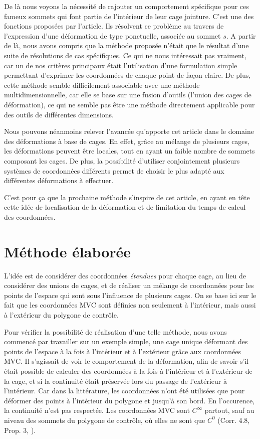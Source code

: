 De là nous voyons la nécessité de rajouter un comportement spécifique
pour ces fameux sommets qui font partie de l'intérieur de leur cage
jointure. C'est une des fonctions proposées par l'article. Ils
résolvent ce problème au travers de l'expression d'une déformation de
type ponctuelle, associée au sommet $s$. A partir de là, nous avons
compris que la méthode proposée \cite{GPCP13} n'était que le résultat
d'une suite de résolutions de cas spécifiques. Ce qui ne nous
intéressait pas vraiment, car un de nos critères principaux était
l'utilisation d'une formulation simple permettant d'exprimer les
coordonnées de chaque point de façon claire. De plus, cette méthode
semble difficilement associable avec une méthode multidimensionnelle,
car elle se base sur une fusion d'outils (l'union des cages de
déformation), ce qui ne semble pas être une méthode directement
applicable pour des outils de différentes dimensions.

Nous pouvons néanmoins relever l'avancée qu'apporte cet article dans
le domaine des déformations à base de cages. En effet, grâce au
mélange de plusieurs cages, les déformations peuvent être locales,
tout en ayant un faible nombre de sommets composant les cages. De
plus, la possibilité d'utiliser conjointement plusieurs systèmes de
coordonnées différents permet de choisir le plus adapté aux
différentes déformations à effectuer.

C'est pour ça que la prochaine méthode s'inspire de cet article, en
ayant en tête cette idée de localisation de la déformation et de
limitation du temps de calcul des coordonnées.

\section{Méthode élaborée}
L'idée est de considérer des coordonnées \textit{étendues} pour chaque
cage, au lieu de considérer des unions de cages, et de réaliser un
mélange de coordonnées pour les points de l'espace qui sont sous
l'influence de plusieurs cages. On se base ici sur le fait que les
coordonnées MVC sont définies non seulement à l'intérieur, mais aussi
à l'extérieur du polygone de contrôle.

Pour vérifier la possibilité de réalisation d'une telle méthode, nous
avons commencé par travailler sur un exemple simple, une cage unique
déformant des points de l'espace à la fois à l'intérieur et à
l'extérieur grâce aux coordonnées MVC. Il s'agissait de voir le
comportement de la déformation, afin de savoir s'il était possible de
calculer des coordonnées à la fois à l'intérieur et à l'extérieur de
la cage, et si la continuité était préservée lors du passage de
l'extérieur à l'intérieur. Car dans la littérature, les coordonnées
n'ont été utilisées que pour déformer des points à l'intérieur du
polygone et jusqu'à son bord. En l'occurence, la continuité n'est pas
respectée. Les coordonnées MVC sont $C^\infty$ partout, sauf au niveau
des sommets du polygone de contrôle, où elles ne sont que $C^0$
(Corr. 4.8, Prop. 3, \cite{HF06}).



